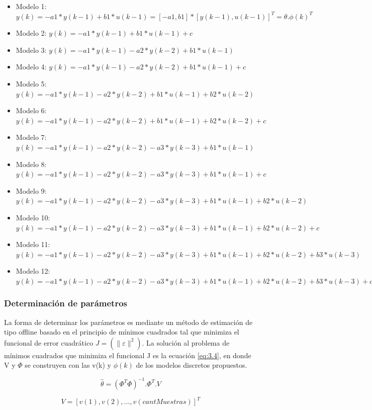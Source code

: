 \begin{itemize}
	\item Modelo 1: \( y(k) = -a1*y(k-1) + b1*u(k-1) = [-a1,b1] * [y(k-1),u(k-1)]^T = \theta . \phi(k)^T\)
	\item Modelo 2: \( y(k) = -a1*y(k-1) + b1*u(k-1) + c \)
	\item Modelo 3: \( y(k) = -a1*y(k-1) - a2*y(k-2) + b1*u(k-1) \)
	\item Modelo 4: \( y(k) = -a1*y(k-1) - a2*y(k-2) + b1*u(k-1) + c \)
	\item Modelo 5: \( y(k) = -a1*y(k-1) - a2*y(k-2) + b1*u(k-1) + b2*u(k-2) \)
	\item Modelo 6: \( y(k) = -a1*y(k-1) - a2*y(k-2) + b1*u(k-1) + b2*u(k-2) + c \)
	\item Modelo 7: \( y(k) = -a1*y(k-1) - a2*y(k-2) - a3*y(k-3) + b1*u(k-1) \)
	\item Modelo 8: \( y(k) = -a1*y(k-1) - a2*y(k-2) - a3*y(k-3) + b1*u(k-1) + c \)
	\item Modelo 9: \( y(k) = -a1*y(k-1) - a2*y(k-2) - a3*y(k-3) + b1*u(k-1) + b2*u(k-2) \)
	\item Modelo 10: \( y(k) = -a1*y(k-1) - a2*y(k-2) - a3*y(k-3) + b1*u(k-1) + b2*u(k-2) + c \)
	\item Modelo 11: \( y(k) = -a1*y(k-1) - a2*y(k-2) - a3*y(k-3) + b1*u(k-1) + b2*u(k-2) + b3*u(k-3) \)
	\item Modelo 12: \( y(k) = -a1*y(k-1) - a2*y(k-2) - a3*y(k-3) + b1*u(k-1) + b2*u(k-2) + b3*u(k-3) + c \)
\end{itemize}



\subsubsection{Determinación de parámetros}
La forma de determinar los parámetros es mediante un método de estimación de tipo offline basado en el principio de mínimos cuadrados tal que minimiza el funcional de error cuadrático \(J = (\|\varepsilon\|^2) \). La solución al problema de mínimos cuadrados que minimiza el funcional J es la ecuación \ref{eq:3.4}, en donde V y \(\Phi\) se construyen con las v(k) y \(\phi(k)\) de los modelos discretos propuestos. 

\begin{equation} \label{eq:\theequation}
\hat{\theta} = (\Phi^T \Phi)^{-1}.\Phi^T.V
\end{equation}

\[ V = [v(1),v(2),...,v(cantMuestras)]^T \]

